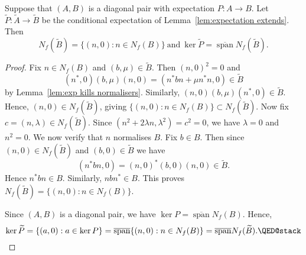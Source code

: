 \documentclass[12pt,a4paper]{amsart}
\newcommand{\lsp}{\operatorname{span}}
\newcommand{\clsp}{\overline{\lsp}}
\begin{document}
\begin{lemma}\label{lem-kerneloftildeP}
Suppose that $(A, B)$ is a diagonal pair with  expectation
$P:A\to B$. Let $\widetilde{P} : \widetilde{A} \to
\widetilde{B}$ be the conditional expectation of
Lemma~\ref{lem:expectation extends}. Then
\[
N_f(\widetilde B) = \{(n,0): n\in N_f(B)\} \ \text{and} \
\ker\widetilde{P} = \clsp N_f(\widetilde B).
\]
\end{lemma}

\begin{proof}
Fix $n \in N_f(B)$ and $(b, \mu) \in \widetilde B$. Then $(n,
0)^2 = 0$ and
\[
(n^*, 0)(b, \mu)(n,0) = (n^*bn + \mu n^*n, 0) \in \widetilde B
\]
by Lemma~\ref{lem:exp kills normalisers}. Similarly, $(n, 0)(b, \mu)(n^*, 0)  \in \widetilde B$.
Hence, $(n, 0) \in N_f(\widetilde B)$, giving $\{(n,0) : n \in
N_f(B)\} \subset N_f(\widetilde{B})$.
Now fix $c = (n, \lambda) \in N_f(\widetilde B)$. Since $(n^2 +
2\lambda n, \lambda^2) = c^2 = 0$, we have $\lambda = 0$ and
$n^2 = 0$. We now verify that $n$ normalises $B$.  Fix $b \in
B$.  Then since $(n, 0) \in N_f(\widetilde B)$ and $(b, 0) \in
\widetilde B$ we have
\[
(n^*bn, 0) = (n, 0)^*(b, 0)(n, 0) \in \widetilde B.
\]
Hence $n^*bn \in B$. Similarly, $nbn^* \in B$.
This proves $N_f(\widetilde B) = \{(n,0): n\in N_f(B)\}$.

Since  $(A,B)$ is a diagonal pair, we have $\ker P = \clsp
N_f(B)$.  Hence,
\[
\ker\widetilde P =\{(a,0):a\in\ker P\} = \clsp\{(n,0):  n\in N_f(B)\} = \clsp N_f(\widetilde B).\qedhere
\]
\end{proof}
\end{document}
